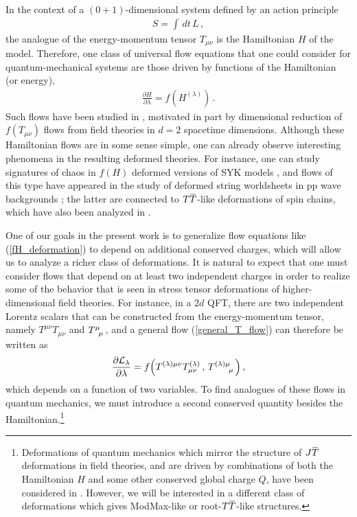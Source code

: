 \documentclass[12pt]{article}
\numberwithin{equation}{section}
\newcommand{\overbar}[1]{\mkern 1.5mu\overline{\mkern-1.5mu#1\mkern-1.5mu}\mkern 1.5mu}
\def\TT{{T\overbar{T}}}
\begin{document}
In the context of a $(0+1)$-dimensional system defined by an action principle
%
\begin{align}
    S = \int \, dt \, L \, , 
\end{align}
%
the analogue of the energy-momentum tensor $T_{\mu \nu}$ is the Hamiltonian $H$ of the model. Therefore, one class of universal flow equations that one could consider for quantum-mechanical systems are those driven by functions of the Hamiltonian (or energy),
%
\begin{align}\label{fH_deformation}
    \frac{\partial H}{\partial \lambda} = f \left( H^{(\lambda)} \right) \, .
\end{align}
%
Such flows have been studied in \cite{Gross:2019ach,Gross:2019uxi}, motivated in part by dimensional reduction of $f ( T_{\mu \nu} )$ flows from field theories in $d = 2$ spacetime dimensions. Although these Hamiltonian flows are in some sense simple, one can already observe interesting phenomena in the resulting deformed theories. For instance, one can study signatures of chaos in $f(H)$ deformed versions of SYK models \cite{He:2022ryk}, and flows of this type have appeared in the study of deformed string worldsheets in pp wave backgrounds \cite{Nastase:2022dvy}; the latter are connected to $\TT$-like deformations of spin chains, which have also been analyzed in \cite{Pozsgay:2019xak,Marchetto:2019yyt}.

One of our goals in the present work is to generalize flow equations like (\ref{fH_deformation}) to depend on additional conserved charges, which will allow us to analyze a richer class of deformations. It is natural to expect that one must consider flows that depend on at least two independent charges in order to realize some of the behavior that is seen in stress tensor deformations of higher-dimensional field theories. For instance, in a $2d$ QFT, there are two independent Lorentz scalars that can be constructed from the energy-momentum tensor, namely $T^{\mu \nu} T_{\mu \nu}$ and $\tensor{T}{^\mu_\mu}$, and a general flow (\ref{general_T_flow}) can therefore be written as
%
\begin{align}\label{general_T_flow_parameterized}
    \frac{\partial \mathcal{L}_\lambda}{\partial \lambda} = f \Big( T^{(\lambda) \mu \nu} T_{\mu \nu}^{(\lambda)} \, , \, \tensor{T}{^{(\lambda)}^\mu_\mu} \Big) \, , 
\end{align}
%
which depends on a function of two variables. To find analogues of these flows in quantum mechanics, we must introduce a second conserved quantity besides the Hamiltonian.\footnote{Deformations of quantum mechanics which mirror the structure of $J \overbar{T}$ deformations \cite{Guica:2017lia,Bzowski:2018pcy,Guica:2019vnb,Anous:2019osb,Guica:2020eab,Guica:2021pzy,Guica:2021fkv} in field theories, and are driven by combinations of both the Hamiltonian $H$ and some other conserved global charge $Q$, have been considered in \cite{Chakraborty:2020xwo}. However, we will be interested in a different class of deformations which gives ModMax-like or root-$\TT$-like structures.}
\end{document}
